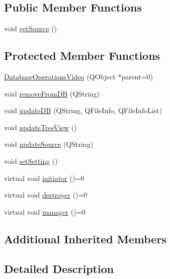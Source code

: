 \subsection*{Public Member Functions}
\begin{DoxyCompactItemize}
\item 
void \hyperlink{class_database_operations_video_a16849f71aa872f601c6651b43e786dab}{get\-Source} ()
\end{DoxyCompactItemize}
\subsection*{Protected Member Functions}
\begin{DoxyCompactItemize}
\item 
\hyperlink{class_database_operations_video_a319eb8b79f4f4015b2831bbf2f3c6b7b}{Database\-Operations\-Video} (Q\-Object $\ast$parent=0)
\item 
void \hyperlink{class_database_operations_video_a3187c0433cbc90c9cbcbd091bfc76e9d}{remove\-From\-D\-B} (Q\-String)
\item 
void \hyperlink{class_database_operations_video_a2e0c44a699ccc0b6248549bffe8078f9}{update\-D\-B} (Q\-String, Q\-File\-Info, Q\-File\-Info\-List)
\item 
void \hyperlink{class_database_operations_video_a958ad3432e96e3c51664bb687b244d06}{update\-Tree\-View} ()
\item 
void \hyperlink{class_database_operations_video_ac5c4d66e50e9342eede8f63d91057756}{update\-Source} (Q\-String)
\item 
void \hyperlink{class_database_operations_video_ad63d0a1dbc333e058bc910b25bbe74f4}{set\-Setting} ()
\item 
virtual void \hyperlink{class_database_operations_video_ab541cb7de9ff375af08e5e32ca1b217f}{initiator} ()=0
\item 
virtual void \hyperlink{class_database_operations_video_ab2b75036caeaa73cedc14e591d628580}{destroyer} ()=0
\item 
virtual void \hyperlink{class_database_operations_video_a54a804b782a0653e58a53c25040d3f85}{manager} ()=0
\end{DoxyCompactItemize}
\subsection*{Additional Inherited Members}


\subsection{Detailed Description}


